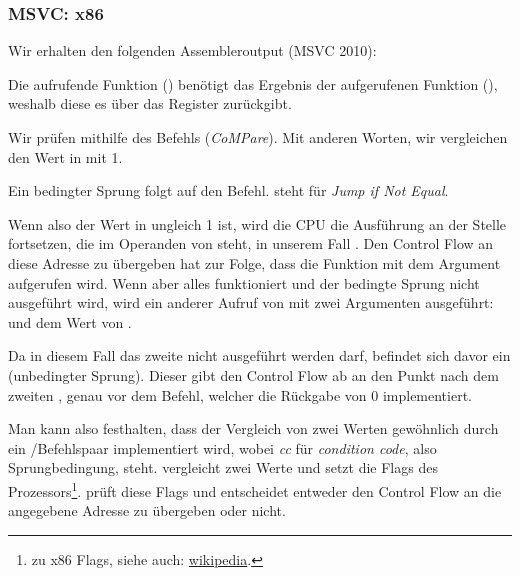 \subsubsection{MSVC: x86}
Wir erhalten den folgenden Assembleroutput (MSVC 2010):



Die aufrufende Funktion (\main) benötigt das Ergebnis der aufgerufenen Funktion (\scanf), weshalb diese es über das
Register \EAX zurückgibt.

Wir prüfen mithilfe des Befehls  (\emph{CoMPare}). Mit anderen Worten, wir vergleichen den Wert in \EAX mit
1.

Ein bedingter \JNE Sprung folgt auf den \CMP Befehl. \JNE steht für \emph{Jump if Not Equal}.

Wenn also der Wert in \EAX ungleich 1 ist, wird die \ac{CPU} die Ausführung an der Stelle fortsetzen, die im Operanden
von \JNE steht, in unserem Fall .
Den Control Flow an diese Adresse zu übergeben hat zur Folge, dass die Funktion \printf mit dem Argument  aufgerufen wird.
Wenn aber alles funktioniert und der bedingte Sprung nicht ausgeführt wird, wird ein anderer Aufruf von \printf mit zwei
Argumenten ausgeführt:\\
 und dem Wert von .


Da in diesem Fall das zweite \printf nicht ausgeführt werden darf, befindet sich davor ein \JMP (unbedingter Sprung).
Dieser gibt den Control Flow ab an den Punkt nach dem zweiten \printf, genau vor dem  Befehl, welcher
die Rückgabe von 0 implementiert.

Man kann also festhalten, dass der Vergleich von zwei Werten gewöhnlich durch ein \CMP/\Jcc Befehlspaar implementiert
wird, wobei \emph{cc} für \emph{condition code}, also Sprungbedingung, steht. 
\CMP vergleicht zwei Werte und setzt die Flags des Prozessors\footnote{zu x86 Flags, siehe auch:
\href{http://en.wikipedia.org/wiki/FLAGS_register_(computing)}{wikipedia}.}.
\Jcc prüft diese Flags und entscheidet entweder den Control Flow an die angegebene Adresse zu übergeben oder nicht.

